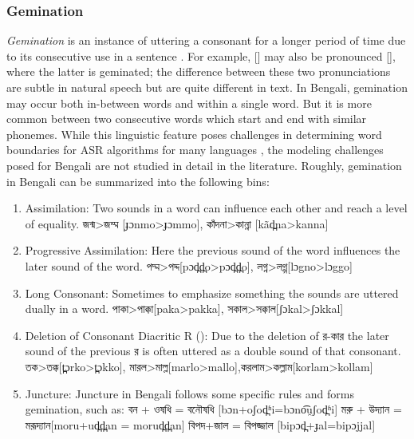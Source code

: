 \subsubsection{Gemination}
\textit{Gemination} is an instance of uttering a consonant for a longer period of time due to its consecutive use in a sentence \cite{kaye2005gemination}. For example, {} [{}] may also be pronounced {} [{}], where the latter is geminated; the difference between these two pronunciations are subtle in natural speech but are quite different in text. In Bengali, gemination may occur both in-between words and within a single word. But it is more common between two consecutive words which start and end with similar phonemes. While this linguistic feature poses challenges in determining word boundaries for ASR algorithms for many languages \cite{messaoudi2006arabic}, the modeling challenges posed for Bengali are not studied in detail in the literature. Roughly, gemination in Bengali can be summarized into the following bins:

\begin{enumerate}
    \item Assimilation: Two sounds in a word can influence each other and reach a level of
equality. {\bengalifont জন্ম>জম্ম} [{\ipafont ɟɔnmo>ɟɔmmo}], {\bengalifont কাঁদনা>কান্না} [{\ipafont kãd̪na>kanna}]



\item Progressive Assimilation: Here the previous sound of the word influences the later
sound of the word. {\bengalifont পদ্ম>পদ্দ}[{\ipafont pɔd̪d̪o>pɔd̪d̪o}], {\bengalifont লগ্ন>লগ্গ}[{\ipafont lɔgno>lɔggo}]


\item Long Consonant: Sometimes to emphasize something the sounds are uttered dually in a word.
{\bengalifont পাকা>পাক্কা}[{\ipafont paka>pakka}], {\bengalifont সকাল>সক্কাল}[{\ipafont ʃɔkal>ʃɔkkal}]

\item Deletion of Consonant Diacritic R ({}): Due to the deletion of {\bengalifont র-কার} the later sound of the previous {\bengalifont র} is often uttered as a double sound of that consonant.  {\bengalifont তক>তক্ক}[{\ipafont t̪ɔrko>t̪ɔkko}], {\bengalifont মারল>মাল্ল}[{\ipafont marlo>mallo}],{\bengalifont করলাম>কল্লাম}[{\ipafont korlam>kollam}]


\item Juncture: Juncture in Bengali follows some specific rules and forms gemination, such as: {\bengalifont বন + ওষধি = বনৌষধি} [{\ipafont bɔn+oʃod̪ʱi=bɔno͡u̯ʃod̪ʱi}] {\bengalifont মরু + উদ্যান = মরূদ্যান}[{\ipafont moru+ud̪d̪an = morud̪d̪an}] {\bengalifont বিপদ+জাল = বিপজ্জাল }[{\ipafont bipɔd̪+ɟal=bipɔjjal}]

\end{enumerate}

